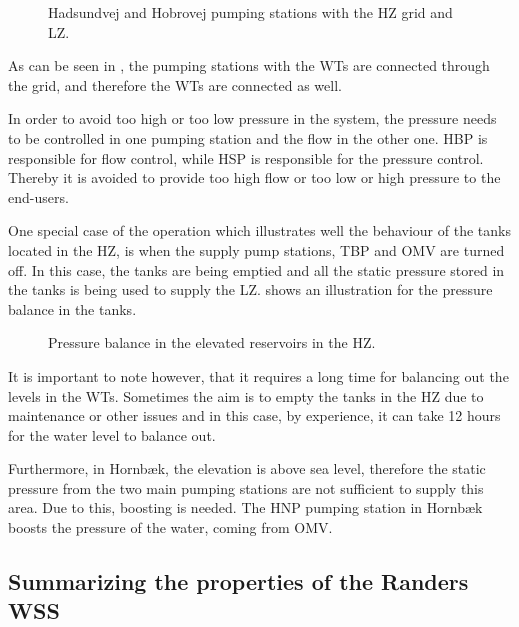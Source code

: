 \begin{figure}[H]
\centering

\caption{Hadsundvej and Hobrovej pumping stations with the HZ grid and LZ.}
\label{fig:HBP_HSP_grid}
\end{figure}

\vspace{-3mm}

As can be seen in , the pumping stations with the WTs are connected through the grid, and therefore the WTs are connected as well.

In order to avoid too high or too low pressure in the system, the pressure needs to be controlled in one pumping station and the flow in the other one. HBP is responsible for flow control, while HSP is responsible for the pressure control. Thereby it is avoided to provide too high flow or too low or high pressure to the end-users. 

One special case of the operation which illustrates well the behaviour of the tanks located in the HZ, is when the supply pump stations, TBP and OMV are turned off. In this case, the tanks are being emptied and all the static pressure stored in the tanks is being used to supply the LZ.  shows an illustration for the pressure balance in the tanks.

\begin{figure}[H]
\centering

\caption{Pressure balance in the elevated reservoirs in the HZ. }
\label{fig:pressure_balance_Randers}
\end{figure}

\vspace{-3mm}
It is important to note however, that it requires a long time for balancing out the levels in the WTs. Sometimes the aim is to empty the tanks in the HZ due to maintenance or other issues and in this case, by experience, it can take 12 hours for the water level to balance out.  

Furthermore, in Hornbæk, the elevation is above sea level, therefore the static pressure from the two main pumping stations are not sufficient to supply this area. Due to this, boosting is needed. The HNP pumping station in Hornbæk boosts the pressure of the water, coming from OMV. 

\subsection{Summarizing the properties of the Randers WSS}
\label{Randers_wss_summary}

